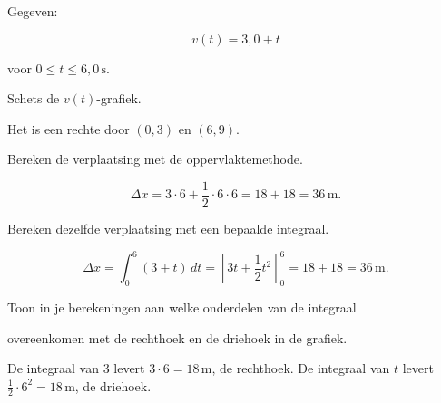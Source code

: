 \documentclass{ximera}
\begin{document}
\begin{oefening}{\oefU\ESS}

Gegeven:

\[v(t)=3,0+t\]

voor $0\leq t\leq6,0\,\mathrm{s}$.

\begin{question}

Schets de $v(t)$-grafiek.

\begin{oplossing}
Het is een rechte door \((0,3)\) en \((6,9)\).
\end{oplossing}

\end{question}

\begin{question}

Bereken de verplaatsing met de oppervlaktemethode.

\begin{oplossing}
\[\Delta x=3\cdot6+\frac12\cdot6\cdot6=18+18=36\,\mathrm{m}.\]
\end{oplossing}

\end{question}

\begin{question}

Bereken dezelfde verplaatsing met een bepaalde integraal.

\begin{oplossing}
\[\Delta x=\int_0^6(3+t)\,dt =\left[3t+\frac12t^2\right]_0^6=18+18=36\,\mathrm{m}.\]
\end{oplossing}

\end{question}

\begin{question}

Toon in je berekeningen aan welke onderdelen van de integraal

overeenkomen met de rechthoek en de driehoek in de grafiek.

\begin{oplossing}
De integraal van \(3\) levert \(3\cdot6=18\,\mathrm{m}\), de rechthoek. De integraal van \(t\) levert \(\frac12\cdot6^2=18\,\mathrm{m}\), de driehoek.
\end{oplossing}

\end{question}

\end{oefening}
\end{document}
